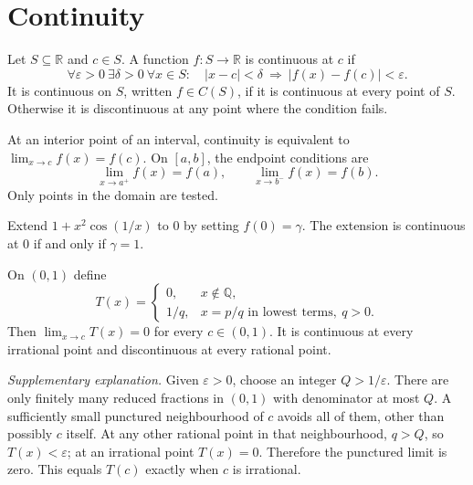 \section{Continuity}
\begin{definition}
Let $S\subseteq\mathbb R$ and $c\in S$. A function $f:S\to\mathbb R$
is continuous at $c$ if
\[
\forall\varepsilon>0\ \exists\delta>0\ \forall x\in S:\quad
|x-c|<\delta\ \Longrightarrow\ |f(x)-f(c)|<\varepsilon.
\]
It is continuous on $S$, written $f\in C(S)$, if it is continuous at every
point of $S$. Otherwise it is discontinuous at any point where the condition
fails.
\end{definition}
At an interior point of an interval, continuity is equivalent to
$\lim_{x\to c}f(x)=f(c)$. On $[a,b]$, the endpoint conditions are
\[
\lim_{x\to a^+}f(x)=f(a),\qquad
\lim_{x\to b^-}f(x)=f(b).
\]
Only points in the domain are tested.

\begin{example}
Extend $1+x^2\cos(1/x)$ to $0$ by setting $f(0)=\gamma$.
The extension is continuous at $0$ if and only if $\gamma=1$.
\end{example}

\begin{example}
On $(0,1)$ define
\[
T(x)=\begin{cases}
0,&x\notin\mathbb Q,\\
1/q,&x=p/q\text{ in lowest terms},\ q>0.
\end{cases}
\]
Then $\lim_{x\to c}T(x)=0$ for every $c\in(0,1)$. It is continuous at
every irrational point and discontinuous at every rational point.

\textit{Supplementary explanation.} Given $\varepsilon>0$, choose an
integer $Q>1/\varepsilon$. There are only finitely many reduced fractions
in $(0,1)$ with denominator at most $Q$. A sufficiently small punctured
neighbourhood of $c$ avoids all of them, other than possibly $c$ itself.
At any other rational point in that neighbourhood, $q>Q$, so
$T(x)<\varepsilon$; at an irrational point $T(x)=0$.
Therefore the punctured limit is zero. This equals $T(c)$ exactly when
$c$ is irrational.
\end{example}

